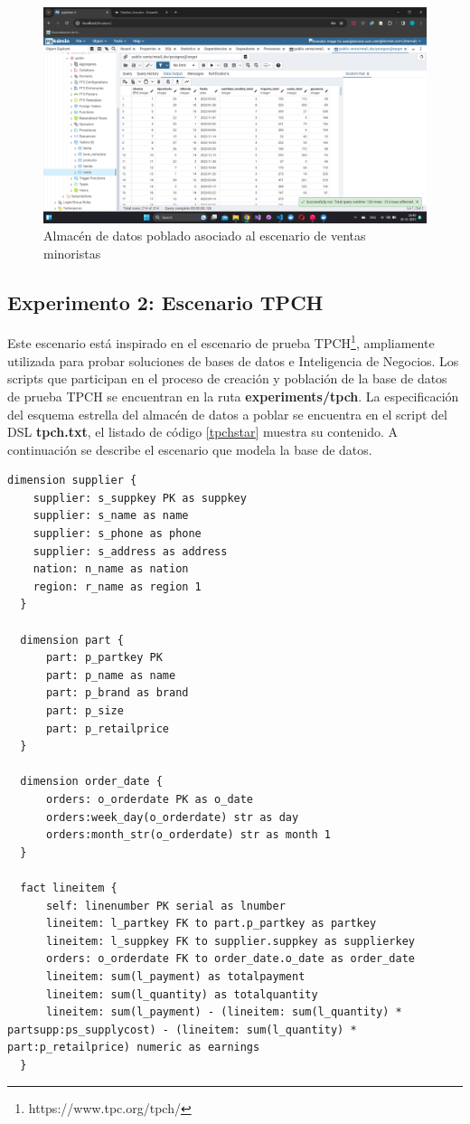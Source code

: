 \begin{figure}
  \centering
  \includegraphics[scale=0.4]{Graphics/fullpgadmin1.png}
  \caption{Almacén de datos poblado asociado al escenario de ventas minoristas}
  \label{fig:fullpg1}
\end{figure}


\subsection{Experimento 2: Escenario TPCH}

Este escenario est\'a inspirado en el escenario de prueba TPCH\footnote{https://www.tpc.org/tpch/}, ampliamente 
utilizada para probar soluciones de bases de datos e Inteligencia de Negocios. Los scripts que participan 
en el proceso de creación y población de la base de datos de prueba TPCH se encuentran en la ruta 
\textbf{experiments/tpch}. La especificación del esquema estrella del almacén de datos a poblar se encuentra 
en el script del DSL \textbf{tpch.txt}, el listado de código \ref{tpchstar} muestra su contenido.  A continuación se describe el escenario que modela la base de datos.

\begin{lstlisting}[label={tpchstar}, caption={Definici\'on del esquema estrella del almacén de datos asociado al escenario TPCH}]
  dimension supplier {
    supplier: s_suppkey PK as suppkey
    supplier: s_name as name
    supplier: s_phone as phone
    supplier: s_address as address
    nation: n_name as nation
    region: r_name as region 1
  }

  dimension part {
      part: p_partkey PK
      part: p_name as name
      part: p_brand as brand
      part: p_size
      part: p_retailprice
  }

  dimension order_date {
      orders: o_orderdate PK as o_date
      orders:week_day(o_orderdate) str as day
      orders:month_str(o_orderdate) str as month 1
  }

  fact lineitem {
      self: linenumber PK serial as lnumber
      lineitem: l_partkey FK to part.p_partkey as partkey
      lineitem: l_suppkey FK to supplier.suppkey as supplierkey
      orders: o_orderdate FK to order_date.o_date as order_date
      lineitem: sum(l_payment) as totalpayment
      lineitem: sum(l_quantity) as totalquantity
      lineitem: sum(l_payment) - (lineitem: sum(l_quantity) * partsupp:ps_supplycost) - (lineitem: sum(l_quantity) * part:p_retailprice) numeric as earnings
  }
\end{lstlisting}

